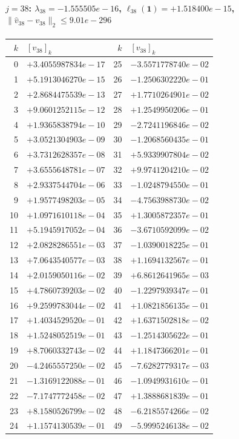 \paragraph{$j = 38$: $\lambda_{38} = -1.555505e-16$, \quad $\ell_{38}(\mathbf{1}) = +1.518400e-15$, \quad $\|\hat{v}_{38} - v_{38}\|_2 \leq 9.01e-296$}
\begin{center}
{\footnotesize
\begin{tabular}{r@{\;\;}l@{\quad}r@{\;\;}l}
\toprule
$k$ & $[v_{38}]_k$ & $k$ & $[v_{38}]_k$ \\
\midrule
0 & $+3.4055987834e-17$ & 25 & $-3.5571778740e-02$ \\
1 & $+5.1913046270e-15$ & 26 & $-1.2506302220e-01$ \\
2 & $+2.8684475539e-13$ & 27 & $+1.7710264901e-02$ \\
3 & $+9.0601252115e-12$ & 28 & $+1.2549950206e-01$ \\
4 & $+1.9365838794e-10$ & 29 & $-2.7241196846e-02$ \\
5 & $+3.0521304903e-09$ & 30 & $-1.2068560435e-01$ \\
6 & $+3.7312628357e-08$ & 31 & $+5.9339907804e-02$ \\
7 & $+3.6555648781e-07$ & 32 & $+9.9741204210e-02$ \\
8 & $+2.9337544704e-06$ & 33 & $-1.0248794550e-01$ \\
9 & $+1.9577498203e-05$ & 34 & $-4.7563988730e-02$ \\
10 & $+1.0971610118e-04$ & 35 & $+1.3005872357e-01$ \\
11 & $+5.1945917052e-04$ & 36 & $-3.6710592099e-02$ \\
12 & $+2.0828286551e-03$ & 37 & $-1.0390018225e-01$ \\
13 & $+7.0643540577e-03$ & 38 & $+1.1694132567e-01$ \\
14 & $+2.0159050116e-02$ & 39 & $+6.8612641965e-03$ \\
15 & $+4.7860739203e-02$ & 40 & $-1.2297939347e-01$ \\
16 & $+9.2599783044e-02$ & 41 & $+1.0821856135e-01$ \\
17 & $+1.4034529520e-01$ & 42 & $+1.6371502818e-02$ \\
18 & $+1.5248052519e-01$ & 43 & $-1.2514305622e-01$ \\
19 & $+8.7060332743e-02$ & 44 & $+1.1847366201e-01$ \\
20 & $-4.2465557250e-02$ & 45 & $-7.6282779317e-03$ \\
21 & $-1.3169122088e-01$ & 46 & $-1.0949931610e-01$ \\
22 & $-7.1747772458e-02$ & 47 & $+1.3888681839e-01$ \\
23 & $+8.1580526799e-02$ & 48 & $-6.2185574266e-02$ \\
24 & $+1.1574130539e-01$ & 49 & $-5.9995246138e-02$ \\
\bottomrule
\end{tabular}
}
\end{center}

